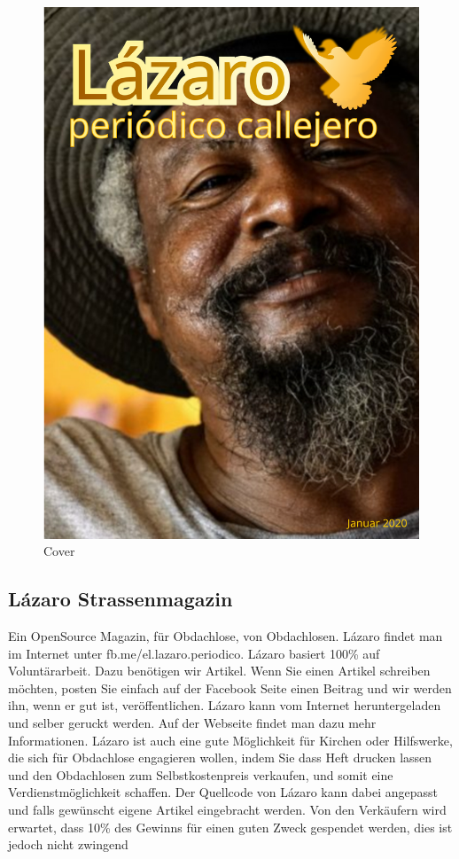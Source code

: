 \documentclass[
]{article}
\author{}
\date{}
\begin{document}
\begin{figure}
\centering
\includegraphics{img/cover.es.svg}
\caption{Cover}
\end{figure}

\hypertarget{luxe1zaro-strassenmagazin}{%
\subsection{Lázaro Strassenmagazin}\label{luxe1zaro-strassenmagazin}}

Ein OpenSource Magazin, für Obdachlose, von Obdachlosen. Lázaro findet
man im Internet unter fb.me/el.lazaro.periodico. Lázaro basiert 100\%
auf Voluntärarbeit. Dazu benötigen wir Artikel. Wenn Sie einen Artikel
schreiben möchten, posten Sie einfach auf der Facebook Seite einen
Beitrag und wir werden ihn, wenn er gut ist, veröffentlichen. Lázaro
kann vom Internet heruntergeladen und selber geruckt werden. Auf der
Webseite findet man dazu mehr Informationen. Lázaro ist auch eine gute
Möglichkeit für Kirchen oder Hilfswerke, die sich für Obdachlose
engagieren wollen, indem Sie dass Heft drucken lassen und den
Obdachlosen zum Selbstkostenpreis verkaufen, und somit eine
Verdienstmöglichkeit schaffen. Der Quellcode von Lázaro kann dabei
angepasst und falls gewünscht eigene Artikel eingebracht werden. Von den
Verkäufern wird erwartet, dass 10\% des Gewinns für einen guten Zweck
gespendet werden, dies ist jedoch nicht zwingend
\end{document}
